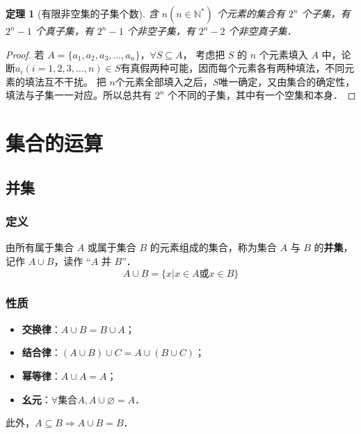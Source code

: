 \documentclass[a4paper,openany]{ctexbook}
\newtheorem{thmlevel1}{定理}[chapter]
\begin{document}
\begin{thmlevel1}[有限非空集的子集个数]\label{thm:zijigeuu}
    含 \(n(n \in \mathbb{N^*})\) 个元素的集合有 \(2^n\) 个子集，有 \(2^n-1\) 个真子集，有 \(2^n-1\) 个非空子集，有 \(2^n-2\) 个非空真子集．
\end{thmlevel1}

\begin{proof}
    若 \(A=\{a_1,a_2,a_3,\dots,a_n\}\)，\(\forall S \subseteq A\)，
    考虑把 \(S\) 的 \(n\) 个元素填入 \(A\) 中，论断\(a_i(i=1,2,3,\dots,n)\in S\)有真假两种可能，因而每个元素各有两种填法，不同元素的填法互不干扰。
    把 \(n\)个元素全部填入之后，\(S\)唯一确定，又由集合的确定性，填法与子集一一对应。所以总共有 \(2^n\) 个不同的子集，其中有一个空集和本身．
\end{proof}

\section{集合的运算}

\subsection{并集}

\subsubsection{定义}

由所有属于集合 \(A\) 或属于集合 \(B\) 的元素组成的集合，称为集合 \(A\) 与 \(B\) 的\textbf{并集}，记作 \(A \cup B\)，读作 “\(A\) 并 \(B\)”．
\[
    A \cup B=\{x|x\in A \text{或} x\in B\}
\]

\subsubsection{性质}

\begin{itemize}
    \item \textbf{交换律}：\(A\cup B=B\cup A\)；
    \item \textbf{结合律}：\((A\cup B)\cup C=A\cup(B\cup C)\)；
    \item \textbf{幂等律}：\(A\cup A=A\)；
    \item \textbf{幺元}：\(\forall\text{集合}A, A\cup\varnothing=A\)．
\end{itemize}

此外，\(A\subseteq B \Rightarrow A\cup B=B\)．
\end{document}
